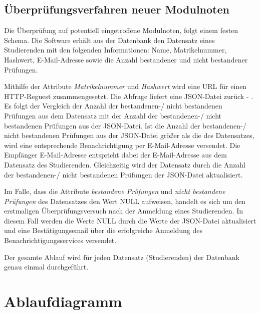 \subsection{Überprüfungsverfahren neuer Modulnoten}
Die Überprüfung auf potentiell eingetroffene Modulnoten, folgt einem festen Schema.
Die Software erhält aus der Datenbank den Datensatz eines Studierenden mit den folgenden Informationen: Name, Matrikelnummer, Hashwert, E-Mail-Adresse sowie die Anzahl bestandener und nicht bestandener Prüfungen.

Mithilfe der Attribute \textit{Matrikelnummer} und \textit{Hashwert} wird eine \ac{URL} für einen HTTP-Reguest zusammengesetzt.
Die Abfrage liefert eine \ac{JSON}-Datei zurück - .
Es folgt der Vergleich der Anzahl der bestandenen-/ nicht bestandenen Prüfungen aus dem Datensatz mit der Anzahl der bestandenen-/ nicht bestandenen Prüfungen aus der \ac{JSON}-Datei.
Ist die Anzahl der bestandenen-/ nicht bestandenen Prüfungen aus der \ac{JSON}-Datei größer als die des Datensatzes, wird eine entsprechende Benachrichtigung per E-Mail-Adresse versendet.
Die Empfänger E-Mail-Adresse entspricht dabei der E-Mail-Adresse aus dem Datensatz des Studierenden.
Gleichzeitig wird der Datensatz durch die Anzahl der bestandenen-/ nicht bestandenen Prüfungen der \ac{JSON}-Datei aktualisiert.

Im Falle, dass die Attribute \textit{bestandene Prüfungen} und \textit{nicht bestandene Prüfungen} des Datensatzes den Wert NULL aufweisen, handelt es sich um den erstmaligen Überprüfungsversuch nach der Anmeldung eines Studierenden.
In diesem Fall werden die Werte NULL durch die Werte der \ac{JSON}-Datei aktualisiert und eine Bestätigungsemail über die erfolgreiche Anmeldung des Benachrichtigungsservices versendet.

Der gesamte Ablauf wird für jeden Datensatz (Studierenden) der Datenbank genau einmal durchgeführt. 








 
\section{Ablaufdiagramm}